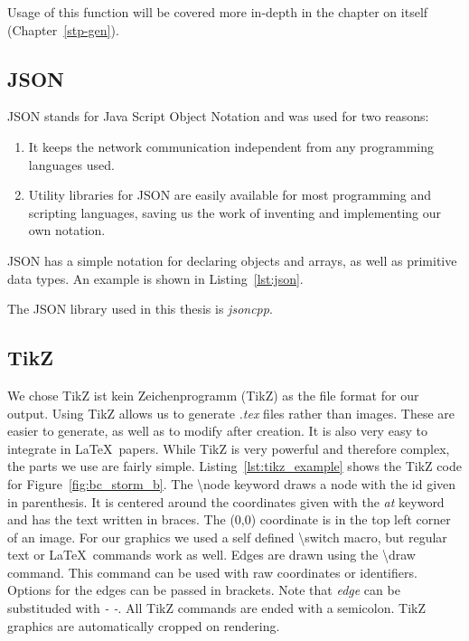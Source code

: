 Usage of this function will be covered more in-depth in the chapter on \tool itself (Chapter~\ref{stp-gen}).
\subsection*{JSON}
\label{json}
JSON stands for Java Script Object Notation and was used for two reasons:
\begin{enumerate}
    \item It keeps the network communication independent from any programming languages used.
    \item Utility libraries for JSON are easily available for most programming and scripting languages, saving us the work of inventing and implementing our own notation.
\end{enumerate}
JSON has a simple notation for declaring objects and arrays, as well as primitive data types.
An example is shown in Listing~\ref{lst:json}.

The JSON library used in this thesis is \textit{jsoncpp}\cite{jsoncpp}.

\subsection*{TikZ}
\label{tikz}
We chose TikZ ist kein Zeichenprogramm (TikZ)\cite{tikz} as the file format for our output.
Using TikZ allows us to generate \textit{.tex} files rather than images.
These are easier to generate, as well as to modify after creation.
It is also very easy to integrate in \LaTeX\ papers.
While TikZ is very powerful and therefore complex, the parts we use are fairly simple.
Listing~\ref{lst:tikz_example} shows the TikZ code for Figure~\ref{fig:bc_storm_b}.
The \textbackslash node keyword draws a node with the id given in parenthesis.
It is centered around the coordinates given with the \textit{at} keyword and has the text written in braces.
The (0,0) coordinate is in the top left corner of an image.
For our graphics we used a self defined \textbackslash switch macro, but regular text or \LaTeX\ commands work as well.
Edges are drawn using the \textbackslash draw command.
This command can be used with raw coordinates or identifiers.
Options for the edges can be passed in brackets.
Note that \textit{edge} can be substituded with \textit{- -}.
All TikZ commands are ended with a semicolon.
TikZ graphics are automatically cropped on rendering.

